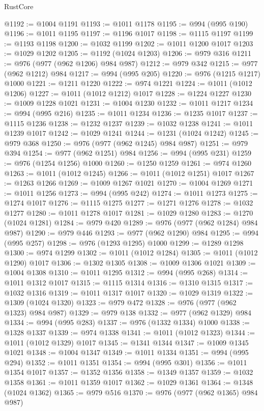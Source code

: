 \begin{lexlean}{RustCore}
\begin{coremodule}
@1192 := @1004 @1191
@1193 := @1011 @1178
@1195 := @994 (@995 @190)
@1196 := @1011 @1195
@1197 := @1196 @1017
@1198 := @1115 @1197
@1199 := @1193 @1198
@1200 := @1032 @1199
@1202 := @1011 @1200 @1017
@1203 := @1029 @1202
@1205 := @1192 (@1024 @1203)
@1206 := @979 @316
@1211 := @976 (@977 (@962 @1206) @984 @987)
@1212 := @979 @342
@1215 := @977 (@962 @1212) @984
@1217 := @994 (@995 @205)
@1220 := @976 (@1215 @1217) @1000
@1221 := @1211 @1220
@1222 := @974 @1221
@1224 := @1011 (@1012 @1206)
@1227 := @1011 (@1012 @1212) @1017
@1228 := @1224 @1227
@1230 := @1009 @1228 @1021
@1231 := @1004 @1230
@1232 := @1011 @1217
@1234 := @994 (@995 @216)
@1235 := @1011 @1234
@1236 := @1235 @1017
@1237 := @1115 @1236
@1238 := @1232 @1237
@1239 := @1032 @1238
@1241 := @1011 @1239 @1017
@1242 := @1029 @1241
@1244 := @1231 (@1024 @1242)
@1245 := @979 @368
@1250 := @976 (@977 (@962 @1245) @984 @987)
@1251 := @979 @394
@1254 := @977 (@962 @1251) @984
@1256 := @994 (@995 @231)
@1259 := @976 (@1254 @1256) @1000
@1260 := @1250 @1259
@1261 := @974 @1260
@1263 := @1011 (@1012 @1245)
@1266 := @1011 (@1012 @1251) @1017
@1267 := @1263 @1266
@1269 := @1009 @1267 @1021
@1270 := @1004 @1269
@1271 := @1011 @1256
@1273 := @994 (@995 @242)
@1274 := @1011 @1273
@1275 := @1274 @1017
@1276 := @1115 @1275
@1277 := @1271 @1276
@1278 := @1032 @1277
@1280 := @1011 @1278 @1017
@1281 := @1029 @1280
@1283 := @1270 (@1024 @1281)
@1284 := @979 @420
@1289 := @976 (@977 (@962 @1284) @984 @987)
@1290 := @979 @446
@1293 := @977 (@962 @1290) @984
@1295 := @994 (@995 @257)
@1298 := @976 (@1293 @1295) @1000
@1299 := @1289 @1298
@1300 := @974 @1299
@1302 := @1011 (@1012 @1284)
@1305 := @1011 (@1012 @1290) @1017
@1306 := @1302 @1305
@1308 := @1009 @1306 @1021
@1309 := @1004 @1308
@1310 := @1011 @1295
@1312 := @994 (@995 @268)
@1314 := @1011 @1312 @1017
@1315 := @1115 @1314
@1316 := @1310 @1315
@1317 := @1032 @1316
@1319 := @1011 @1317 @1017
@1320 := @1029 @1319
@1322 := @1309 (@1024 @1320)
@1323 := @979 @472
@1328 := @976 (@977 (@962 @1323) @984 @987)
@1329 := @979 @138
@1332 := @977 (@962 @1329) @984
@1334 := @994 (@995 @283)
@1337 := @976 (@1332 @1334) @1000
@1338 := @1328 @1337
@1339 := @974 @1338
@1341 := @1011 (@1012 @1323)
@1344 := @1011 (@1012 @1329) @1017
@1345 := @1341 @1344
@1347 := @1009 @1345 @1021
@1348 := @1004 @1347
@1349 := @1011 @1334
@1351 := @994 (@995 @294)
@1352 := @1011 @1351
@1354 := @994 (@995 @301)
@1356 := @1011 @1354 @1017
@1357 := @1352 @1356
@1358 := @1349 @1357
@1359 := @1032 @1358
@1361 := @1011 @1359 @1017
@1362 := @1029 @1361
@1364 := @1348 (@1024 @1362)
@1365 := @979 @516
@1370 := @976 (@977 (@962 @1365) @984 @987)

\end{coremodule}
\end{lexlean}
